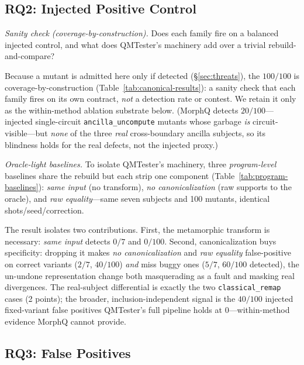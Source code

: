 \subsection{RQ2: Injected Positive Control}

\noindent\emph{Sanity check (coverage-by-construction).} Does each family fire on a balanced injected control, and what does QMTester's machinery add over a trivial rebuild-and-compare?

Because a mutant is admitted here only if detected (\S\ref{sec:threats}), the $100/100$ is coverage-by-construction (Table~\ref{tab:canonical-results}): a sanity check that each family fires on its own contract, \emph{not} a detection rate or contest. We retain it only as the within-method ablation substrate below. (MorphQ detects $20/100$---injected single-circuit \texttt{ancilla\_uncompute} mutants whose garbage \emph{is} circuit-visible---but \emph{none} of the three \emph{real} cross-boundary ancilla subjects, so its blindness holds for the real defects, not the injected proxy.)
\label{sec:oracle-light}

\noindent\emph{Oracle-light baselines.} To isolate QMTester's machinery, three \emph{program-level} baselines share the rebuild but each strip one component (Table~\ref{tab:program-baselines}): \emph{same input} (no transform), \emph{no canonicalization} (raw supports to the oracle), and \emph{raw equality}---same seven subjects and 100 mutants, identical shots/seed/correction.



The result isolates two contributions. First, the metamorphic transform is necessary: \emph{same input} detects $0/7$ and $0/100$. Second, canonicalization buys specificity: dropping it makes \emph{no canonicalization} and \emph{raw equality} false-positive on correct variants ($2/7$, $40/100$) \emph{and} miss buggy ones ($5/7$, $60/100$ detected), the un-undone representation change both masquerading as a fault and masking real divergences. The real-subject differential is exactly the two \texttt{classical\_remap} cases (2 points); the broader, inclusion-independent signal is the $40/100$ injected fixed-variant false positives QMTester's full pipeline holds at $0$---within-method evidence MorphQ cannot provide.

\subsection{RQ3: False Positives}

